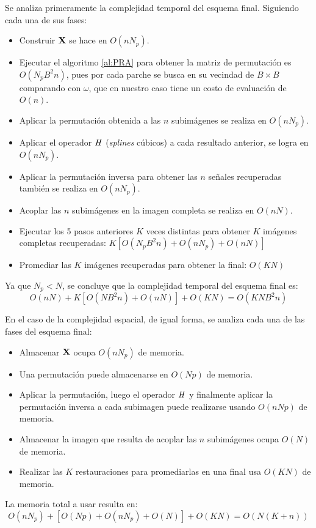 Se analiza primeramente la complejidad temporal del esquema final. Siguiendo cada una de sus fases:
\begin{itemize}
	\item Construir $\mathbf{X}$ se hace en $O(nN_p)$.
	\item Ejecutar el algoritmo \ref{al:PRA} para obtener la matriz de permutaci\'on es $O(N_pB^2n)$, pues por cada parche se busca en su vecindad de $B \times B$ comparando con $\omega$, que en nuestro caso tiene un costo de evaluaci\'on de $O(n)$.
	\item Aplicar la permutaci\'on obtenida a las $n$ subim\'agenes se realiza en $O(nN_p)$.
	\item Aplicar el operador $\mathit{H}$ (\textit{splines} c\'ubicos) a cada resultado anterior, se logra en $O(nN_p)$.
	\item Aplicar la permutaci\'on inversa para obtener las $n$ señales recuperadas también se realiza en $O(nN_p)$.
	\item Acoplar las $n$ subim\'agenes en la imagen completa se realiza en $O(nN)$.
	\item Ejecutar los 5 pasos anteriores $K$ veces distintas para obtener $K$ im\'agenes completas recuperadas: $K[O(N_pB^2n) + O(nN_p) + O(nN)]$
	\item Promediar las $K$ im\'agenes recuperadas para obtener la final: $O(KN)$
\end{itemize}
Ya que $N_p < N$, se concluye que la complejidad temporal del esquema final es:
\begin{equation}
	O(nN) + K[O(NB^2n) + O(nN)] + O(KN) = \boxed{O(KNB^2n)}
	\label{eq:temporal_complexity}
\end{equation}

En el caso de la complejidad espacial, de igual forma, se analiza cada una de las fases del esquema final:
\begin{itemize}
	\item Almacenar $\mathbf{X}$ ocupa $O(nN_p)$ de memoria.
	\item Una permutaci\'on puede almacenarse en $O(Np)$ de memoria.
	\item Aplicar la permutaci\'on, luego el operador $\mathit{H}$ y finalmente aplicar la permutaci\'on inversa a cada subimagen puede realizarse usando $O(nNp)$ de memoria.
	\item Almacenar la imagen que resulta de acoplar las $n$ subim\'agenes ocupa $O(N)$ de memoria.
	\item Realizar las $K$ restauraciones para promediarlas en una final usa $O(KN)$ de memoria.
\end{itemize}
La memoria total a usar resulta en:
\begin{equation}
	O(nN_p) + [O(Np) + O(nN_p) + O(N)] + O(KN) = \boxed{O(N(K + n))}
	\label{eq:spacial_complexity}
\end{equation}


